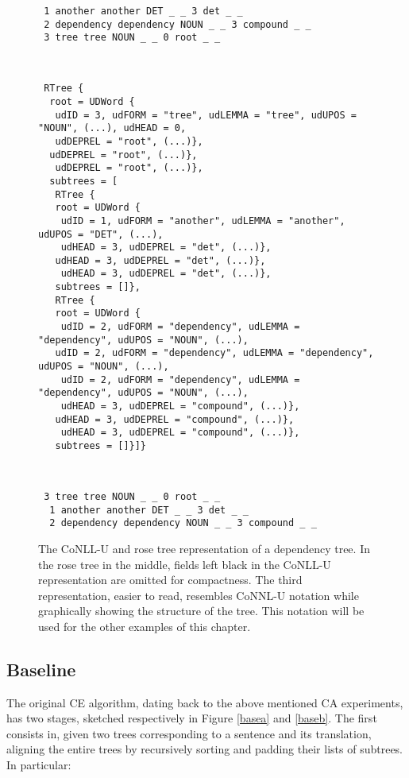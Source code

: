 \begin{figure}[H]
  \centering
  \scriptsize
  \begin{verbatim}
 1 another another DET _ _ 3 det _ _
 2 dependency dependency NOUN _ _ 3 compound _ _
 3 tree tree NOUN _ _ 0 root _ _
 
  \end{verbatim}
  \begin{verbatim}
   
 RTree {
  root = UDWord {
   udID = 3, udFORM = "tree", udLEMMA = "tree", udUPOS = "NOUN", (...), udHEAD = 0,
   udDEPREL = "root", (...)}, 
  udDEPREL = "root", (...)}, 
   udDEPREL = "root", (...)}, 
  subtrees = [
   RTree {
   root = UDWord {
    udID = 1, udFORM = "another", udLEMMA = "another", udUPOS = "DET", (...),
    udHEAD = 3, udDEPREL = "det", (...)}, 
   udHEAD = 3, udDEPREL = "det", (...)}, 
    udHEAD = 3, udDEPREL = "det", (...)}, 
   subtrees = []},
   RTree {
   root = UDWord {
    udID = 2, udFORM = "dependency", udLEMMA = "dependency", udUPOS = "NOUN", (...), 
   udID = 2, udFORM = "dependency", udLEMMA = "dependency", udUPOS = "NOUN", (...), 
    udID = 2, udFORM = "dependency", udLEMMA = "dependency", udUPOS = "NOUN", (...), 
    udHEAD = 3, udDEPREL = "compound", (...)}, 
   udHEAD = 3, udDEPREL = "compound", (...)}, 
    udHEAD = 3, udDEPREL = "compound", (...)}, 
   subtrees = []}]}
 
  \end{verbatim}
 
  \begin{verbatim}
   
 3 tree tree NOUN _ _ 0 root _ _
  1 another another DET _ _ 3 det _ _
  2 dependency dependency NOUN _ _ 3 compound _ _
  \end{verbatim}
  \caption[The CoNLL-U and rose tree representations of a dependency tree]{The CoNLL-U and rose tree representation of a dependency tree. In the rose tree in the middle, fields left black in the CoNLL-U representation are omitted for compactness. The third representation, easier to read, resembles CoNNL-U notation while graphically showing the structure of the tree. This notation will be used for the other examples of this chapter.}
 \end{figure}

\subsection{Baseline} \label{baseline}
The original CE algorithm, dating back to the above mentioned CA experiments, has two stages, sketched respectively in Figure \ref{basea} and \ref{baseb}. The first consists in, given two trees corresponding to a sentence and its translation, aligning the entire trees by recursively sorting and padding their lists of subtrees. In particular: \smallskip

